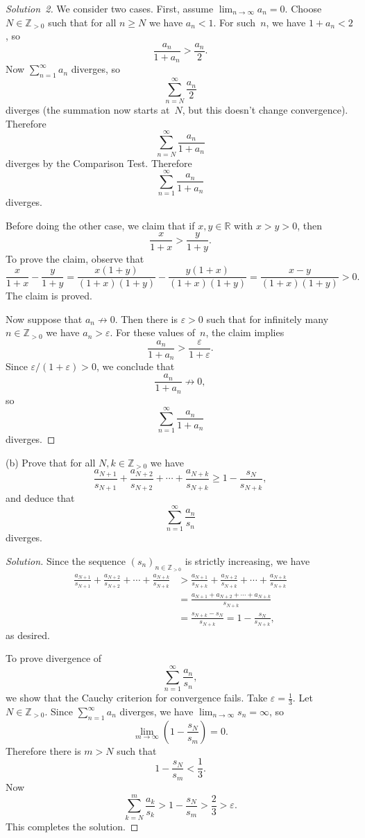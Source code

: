 \documentclass[10pt]{amsart}
\newcommand{\I}{\infty}
\newcommand{\limi}[1]{\lim_{{#1} \to \infty}}
\theoremstyle{definition}
\newcommand{\ep}{\varepsilon}
\newcommand{\R}{{\mathbb{R}}}
\newcommand{\N}{{\mathbb{Z}}_{> 0}}
\begin{document}
\begin{proof}[Solution~2]
We consider two cases.
First,
assume $\limi{n} a_n = 0$.
Choose $N \in \N$ such that for all $n \geq N$
we have $a_n < 1$.
For such~$n$,
we have
$1 + a_n < 2$,
so
\[
\frac{a_n}{1 + a_n} > \frac{a_n}{2}.
\]
Now
$\sum_{n = 1}^{\infty} a_n$ diverges,
so
\[
\sum_{n = N}^{\infty} \frac{a_n}{2}
\]
diverges (the summation now starts at~$N$,
but this doesn't change convergence).
Therefore
\[
\sum_{n = N}^{\infty} \frac{a_n}{1 + a_n}
\]
diverges by the Comparison Test.
Therefore
\[
\sum_{n = 1}^{\infty} \frac{a_n}{1 + a_n}
\]
diverges.

Before doing the other case,
we claim that if $x, y \in \R$ with $x > y > 0$,
then
\[
\frac{x}{1 + x} > \frac{y}{1 + y}.
\]
To prove the claim,
observe that
\[
\frac{x}{1 + x} - \frac{y}{1 + y}
 = \frac{x (1 + y)}{(1 + x)(1 + y)} - \frac{y (1 + x)}{(1 + x)(1 + y)}
 = \frac{x - y}{(1 + x)(1 + y)}
 > 0.
\]
The claim is proved.

Now suppose that $a_n \not\to 0$.
Then there is $\ep > 0$
such that for infinitely many $n \in \N$
we have $a_n > \ep$.
For these values of~$n$,
the claim implies
\[
\frac{a_n}{1 + a_n}
 > \frac{\ep}{1 + \ep}.
\]
Since $\ep / (1 + \ep) > 0$,
we conclude that
\[
\frac{a_n}{1 + a_n} \not\to 0,
\]
so
\[
\sum_{n = 1}^{\infty} \frac{a_n}{1 + a_n}
\]
diverges.
\end{proof}


(b)
Prove that for all $N, k \in \N$ we have
\[
\frac{a_{N + 1}}{s_{N + 1}} + \frac{a_{N + 2}}{s_{N + 2}}
    + \cdots + \frac{a_{N + k}}{s_{N + k}}
 \geq 1 - \frac{s_N}{s_{N + k}},
\]
and deduce that
\[
\sum_{n = 1}^{\infty} \frac{a_n}{s_n}
\]
diverges.

\begin{proof}[Solution]
Since the sequence $(s_n)_{n \in \N}$
is strictly increasing,
we have
%
\begin{align*}
\frac{a_{N + 1}}{s_{N + 1}} + \frac{a_{N + 2}}{s_{N + 2}}
    + \cdots + \frac{a_{N + k}}{s_{N + k}}
& > \frac{a_{N + 1}}{s_{N + k}} + \frac{a_{N + 2}}{s_{N + k}}
    + \cdots + \frac{a_{N + k}}{s_{N + k}}
\\
& = \frac{a_{N + 1} + a_{N + 2} + \cdots + a_{N + k}}{s_{N + k}}
\\
& = \frac{s_{N + k} - s_{N}}{s_{N + k}}
  = 1 - \frac{s_N}{s_{N + k}},
\end{align*}
%
as desired.

To prove divergence of
\[
\sum_{n = 1}^{\infty} \frac{a_n}{s_n},
\]
we show that the Cauchy criterion for convergence fails.
Take $\ep = \frac{1}{3}$.
Let $N \in \N$.
Since $\sum_{n = 1}^{\infty} a_n$ diverges,
we have $\limi{n} s_n = \I$,
so
\[
\limi{m} \left( 1 - \frac{s_N}{s_{m}} \right) = 0.
\]
Therefore there is $m > N$ such that
\[
1 - \frac{s_N}{s_{m}} < \frac{1}{3}.
\]
Now
\[
\sum_{k = N}^m \frac{a_k}{s_k}
 > 1 - \frac{s_N}{s_{m}}
 > \frac{2}{3}
 > \ep.
\]
This completes the solution.
\end{proof}
\end{document}
